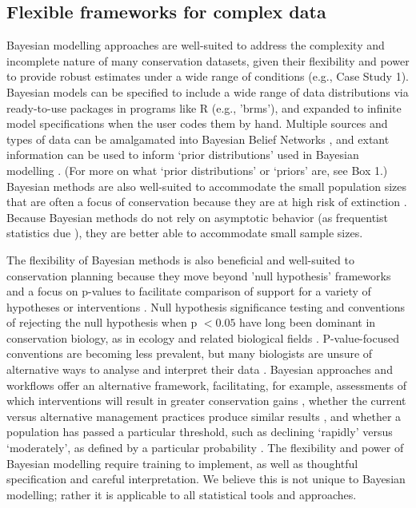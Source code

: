 \documentclass{article}
\begin{document}
\subsection*{Flexible frameworks for complex data}
\par Bayesian modelling approaches are well-suited to address the complexity and incomplete nature of many conservation datasets, given their flexibility and power to provide robust estimates under a wide range of conditions (e.g., Case Study 1). Bayesian models can be specified to include a wide range of data distributions via ready-to-use packages in programs like R (e.g., 'brms'), and expanded to infinite  model specifications when the user codes them by hand. Multiple sources and types of data can be amalgamated into Bayesian Belief Networks \citep{marcot2001using,newton2007bayesian}, and extant information can be used to inform `prior distributions' used in Bayesian modelling \citep{o2008informed,mcneish2016using}. (For more on what `prior distributions' or `priors' are, see Box 1.)
Bayesian methods are also well-suited to accommodate the small population sizes that are often a focus of conservation because they are at high risk of extinction \citep{stinchcombe2002influence}. Because Bayesian methods do not rely on asymptotic behavior (as frequentist statistics due \citep{mcneish2016using}), they are better able to accommodate small sample sizes.
\par The flexibility of Bayesian methods is also beneficial and well-suited to conservation planning because they move beyond 'null hypothesis' frameworks and a focus on p-values to facilitate comparison of support for a variety of hypotheses or interventions \citep{Zyl2018}. Null hypothesis significance testing and conventions of rejecting the null hypothesis when p $<0.05$ have long been dominant in conservation biology, as in ecology and related biological fields \citep[e.g., ecotoxicaology][]{erickson2020moving}. P-value-focused conventions are becoming less prevalent, but many biologists are unsure of alternative ways to analyse and interpret their data \citep{halsey2019reign}. Bayesian approaches and workflows offer an alternative framework, facilitating, for example, assessments of which interventions will result in greater conservation gains \citep{prato2005bayesian}, whether the current versus alternative management practices produce similar results \citep{gallistel2009importance}, and whether a population has passed a particular threshold, such as declining `rapidly' versus `moderately', as defined by a particular probability \citep{brooks2008quantifying}. The flexibility and power of Bayesian modelling require training to implement, as well as thoughtful specification and careful interpretation. We believe this is not unique to Bayesian modelling; rather it is applicable to all statistical tools and approaches.
\end{document}
